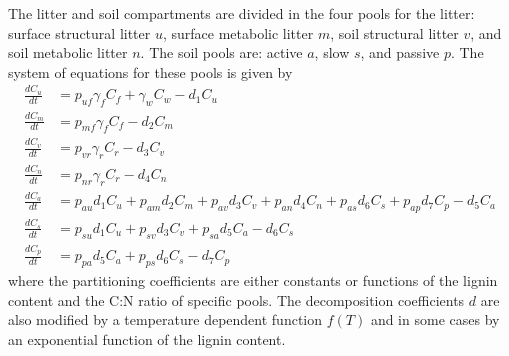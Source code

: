 \documentclass[11pt,a4paper]{article}
\begin{document}
The litter and soil compartments are divided in the four pools for the litter: surface structural litter $u$, surface metabolic litter $m$, soil structural litter $v$, and soil metabolic litter $n$. The soil pools are: active $a$, slow $s$, and passive $p$. The system of equations for these pools is given by
\begin{align}
\frac{dC_u}{dt} &= p_{uf} \gamma_f C_f + \gamma_w C_w - d_1 C_u \\
\frac{dC_m}{dt} &= p_{mf} \gamma_f C_f - d_2 C_m \\
\frac{dC_v}{dt} &= p_{vr} \gamma_r C_r - d_3 C_v \\
\frac{dC_n}{dt} &= p_{nr} \gamma_r C_r - d_4 C_n \\
\frac{dC_a}{dt} &= p_{au} d_1 C_u + p_{am} d_2 C_m + p_{av} d_3 C_v + p_{an} d_4 C_n + p_{as} d_6 C_s + p_{ap} d_7 C_p - d_5 C_a \\
\frac{dC_s}{dt} &= p_{su} d_1 C_u + p_{sv} d_3 C_v + p_{sa} d_5 C_a - d_6 C_s \\
\frac{dC_p}{dt} &= p_{pa} d_5 C_a + p_{ps} d_6 C_s - d_7 C_p
\end{align}
where the partitioning coefficients are either constants or functions of the lignin content and the C:N ratio of specific pools. The decomposition coefficients $d$ are also modified by a temperature dependent function $f(T)$ and in some cases by an exponential function of the lignin content. 
\end{document}
